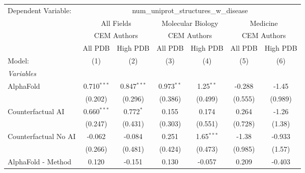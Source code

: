 \begingroup
\centering
\begin{tabular}{lcccccc}
   \tabularnewline \midrule \midrule
   Dependent Variable: & \multicolumn{6}{c}{num\_uniprot\_structures\_w\_disease}\\
 & \multicolumn{2}{c}{All Fields} & \multicolumn{2}{c}{Molecular Biology} & \multicolumn{2}{c}{Medicine} \\
\cmidrule(lr){2-3} \cmidrule(lr){4-5} \cmidrule(lr){6-7}
 & \multicolumn{2}{c}{CEM Authors} & \multicolumn{2}{c}{CEM Authors} & \multicolumn{2}{c}{CEM Authors} \\
\cmidrule(lr){2-3} \cmidrule(lr){4-5} \cmidrule(lr){6-7}
 & \multicolumn{1}{c}{All PDB} & \multicolumn{1}{c}{High PDB} & \multicolumn{1}{c}{All PDB} & \multicolumn{1}{c}{High PDB} & \multicolumn{1}{c}{All PDB} & \multicolumn{1}{c}{High PDB} \\
\cmidrule(lr){2-2} \cmidrule(lr){3-3} \cmidrule(lr){4-4} \cmidrule(lr){5-5} \cmidrule(lr){6-6} \cmidrule(lr){7-7}
   Model:                                                     & (1)           & (2)           & (3)           & (4)           & (5)        & (6)\\  
   \midrule
   \emph{Variables}\\
   AlphaFold                                                  & 0.710$^{***}$ & 0.847$^{***}$ & 0.973$^{**}$  & 1.25$^{**}$   & -0.288     & -1.45\\   
                                                              & (0.202)       & (0.296)       & (0.386)       & (0.499)       & (0.555)    & (0.989)\\   
   Counterfactual AI                                          & 0.660$^{***}$ & 0.772$^{*}$   & 0.155         & 0.174         & 0.264      & -1.26\\   
                                                              & (0.247)       & (0.431)       & (0.303)       & (0.551)       & (0.728)    & (1.38)\\   
   Counterfactual No AI                                       & -0.062        & -0.084        & 0.251         & 1.65$^{***}$  & -1.38      & -0.933\\   
                                                              & (0.266)       & (0.481)       & (0.424)       & (0.473)       & (0.985)    & (1.57)\\   
   AlphaFold - Method                                         & 0.120         & -0.151        & 0.130         & -0.057        & 0.209      & -0.403\\   

\end{tabular}

